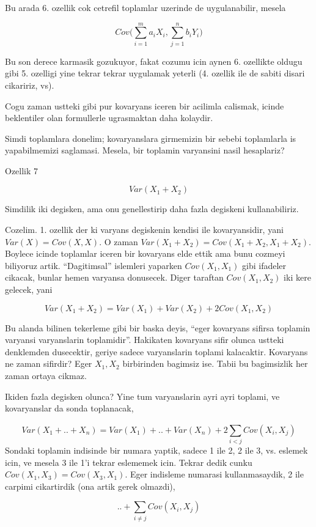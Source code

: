 \documentclass[12pt,fleqn]{article}\usepackage{../common}
\begin{document}
Bu arada 6. ozellik cok cetrefil toplamlar uzerinde de uygulanabilir,
mesela 

$$ Cov \bigg( \sum _{i=1}^{m}a_iX_i, \sum _{j=1}^{n}b_iY_i \bigg) $$

Bu son derece karmasik gozukuyor, fakat cozumu icin aynen 6. ozellikte
oldugu gibi 5. ozelligi yine tekrar tekrar uygulamak yeterli (4. ozellik
ile de sabiti disari cikaririz, vs).

Cogu zaman ustteki gibi pur kovaryans iceren bir acilimla calismak, icinde
beklentiler olan formullerle ugrasmaktan daha kolaydir. 

Simdi toplamlara donelim; kovaryanslara girmemizin bir sebebi toplamlarla
is yapabilmemizi saglamasi. Mesela, bir toplamin varyansini nasil
hesaplariz? 

Ozellik 7

$$ Var(X_1+X_2) $$

Simdilik iki degisken, ama onu genellestirip daha fazla degiskeni
kullanabiliriz. 

Cozelim. 1. ozellik der ki varyans degiskenin kendisi ile kovaryansidir,
yani $Var(X) = Cov(X,X)$. O zaman $Var(X_1+X_2) = Cov(X_1+X_2,
X_1+X_2)$. 
Boylece icinde toplamlar iceren bir kovaryans elde ettik ama bunu cozmeyi 
biliyoruz artik. ``Dagitimsal'' islemleri yaparken $Cov(X_1,X_1)$ gibi
ifadeler cikacak, bunlar hemen varyansa donusecek. Diger taraftan
$Cov(X_1,X_2)$ iki kere gelecek, yani

$$ Var(X_1+X_2) = Var(X_1) + Var(X_2)  + 2 Cov(X_1,X_2)$$

Bu alanda bilinen tekerleme gibi bir baska deyis, ``eger kovaryans sifirsa
toplamin varyansi varyanslarin toplamidir''. Hakikaten kovaryans sifir
olunca ustteki denklemden dusecektir, geriye sadece varyanslarin toplami
kalacaktir. Kovaryans ne zaman sifirdir? Eger $X_1,X_2$ birbirinden
bagimsiz ise. Tabii bu bagimsizlik her zaman ortaya cikmaz. 

Ikiden fazla degisken olunca? Yine tum varyanslarin ayri ayri toplami, ve
kovaryanslar da sonda toplanacak,

$$ Var(X_1+ .. + X_n ) = Var(X_1) + .. + Var(X_n) + 2 \sum _{i<j}^{} Cov(X_i,X_j) $$
Sondaki toplamin indisinde bir numara yaptik, sadece 1 ile 2, 2 ile 3,
vs. eslemek icin, ve mesela 3 ile 1'i tekrar eslememek icin. Tekrar dedik
cunku $Cov(X_1,X_3) = Cov(X_3,X_1)$. Eger indisleme numarasi
kullanmasaydik, 2 ile carpimi cikartirdik (ona artik gerek olmazdi),

$$ ..  + \sum _{i \ne j} Cov(X_i,X_j) $$
\end{document}
